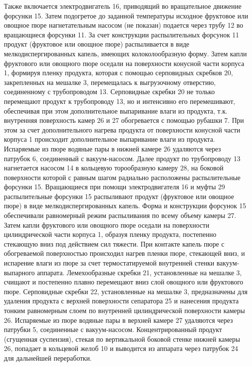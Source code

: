 Также включается электродвигатель 16, приводящий во вращательное движение форсунки 15.
Затем подогретое до заданной температуры исходное фруктовое или овощное пюре нагнетательным насосом (не показан) подается через трубу 12 во вращающиеся форсунки 11.
За счет конструкции распылительных форсунок 11 продукт (фруктовое или овощное пюре) распыливается в виде мелкодиспергированных капель, имеющих
колоколообразную форму.
Затем капли фруктового или овощного пюре оседали на поверхности конусной части корпуса 1, формируя пленку продукта, которая с помощью серповидных скребков 20, закрепленных на мешалке 3, перемещалась к выгрузочному отверстию, соединенному с трубопроводом 13.
Серповидные скребки 20 не только перемещают продукт к трубопроводу 13, но и интенсивно его перемешивают, обеспечивая при этом дополнительное выпаривание влаги из продукта, т.к. внутренняя поверхность камер 26 и 27 обогревается с помощью рубашки 7. 
При этом за счет дополнительного нагрева продукта от поверхности конусной части корпуса 1 происходит дополнительное выпаривание влаги из продукта.
Испаряемые из пюре водяные пары в нижней камере 26 удаляются через патрубок 6, соединенный с вакуум-насосом.
Далее продукт по трубопроводу 13 нагнетается насосом 14 в кольцевую торообразную камеру 28, на боковой поверхности которой с равным шагом радиально расположены распылительные форсунки 15.
Вращающиеся при помощи электродвигателя 16 и муфты 29 распылительные форсунки 15 распыливают продукт (фруктовое или овощное пюре) в виде мелкодиспергированных капель.
Форма и конструкции форсунок 15 обеспечивали равномерный режим распыливания по всему объему камеры 27. 
Затем капли фруктового или овощного пюре оседали на поверхности цилиндрической части корпуса 1, образуя пленку продукта, постепенно стекающую вниз под действием сил тяжести.
При контакте капель пюре с обогреваемой поверхностью происходил нагрев пленки пюре, стекающей вниз, и испарение влаги из пюре за счет термостатируемой внутренней стенки вакуум-выпарного аппарата.
Лемехообразные скребки 21, установленные на мешалке 3, счищают и постепенно плавно перемещают вниз слой овощного или фруктового пюре.
Серповидные скребки 22, установленные на мешалке 3, предназначены для удаления продукта с верхней поверхности сепаратора 25 и нанесения продукта тонким равномерным слоем по внутренней цилиндрической поверхности камеры 26.
Испаряемые из пюре водяные пары в верхней камере 27 удаляются через патрубки 5, соединенные с вакуум-насосом.
Концентрированный продукт (сгущенная суспензия), стекая по вертикальной
боковой стенке нижней камеры 26, попадает в кольцевой желоб 10 и выводится из аппарата через патрубок 24 для дальнейшей переработки.
